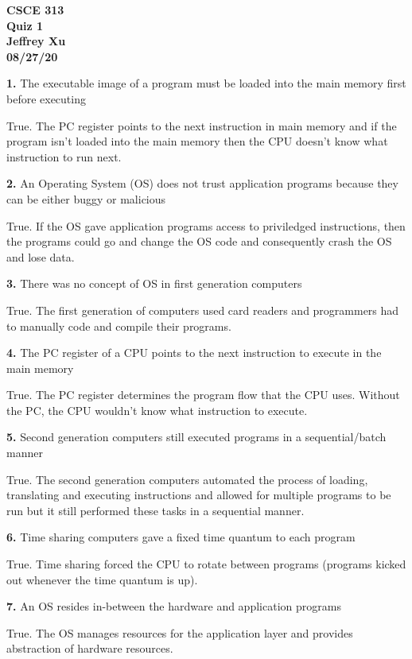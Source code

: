 \documentclass[12pt]{article}
\begin{document}
\begin{center}

{\bf
CSCE 313\\
Quiz 1\\
Jeffrey Xu\\
08/27/20\\
}

\end{center}

{\bf 1.} The executable image of a program must be loaded into the main memory first before
executing

True. The PC register points to the next instruction in main memory and if the program isn't loaded into the main memory then the CPU doesn't know what instruction to run next. 

{\bf 2.} An Operating System (OS) does not trust application programs because they can be either
buggy or malicious

True. If the OS gave application programs access to priviledged instructions, then the programs could go and change the OS code and consequently crash the OS and lose data. 

{\bf 3.} There was no concept of OS in first generation computers

True. The first generation of computers used card readers and programmers had to manually code and compile their programs. 

{\bf 4.} The PC register of a CPU points to the next instruction to execute in the main memory

True. The PC register determines the program flow that the CPU uses. Without the PC, the CPU wouldn't know what instruction to execute. 

{\bf 5.} Second generation computers still executed programs in a sequential/batch manner

True. The second generation computers automated the process of loading, translating and executing instructions and allowed for multiple programs to be run but it still performed these tasks in a sequential manner. 

{\bf 6.} Time sharing computers gave a fixed time quantum to each program

True. Time sharing forced the CPU to rotate between programs (programs kicked out whenever the time quantum is up). 

{\bf 7.} An OS resides in-between the hardware and application programs

True. The OS manages resources for the application layer and provides abstraction of hardware resources. 
\end{document}
